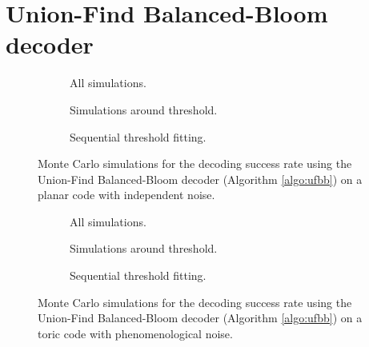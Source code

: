 \section{Union-Find Balanced-Bloom decoder}\label{ap:figufbb}


\begin{figure}[htbp]
  \centering
  \begin{subfigure}[b]{\textwidth}
    \begin{adjustbox}{Clip=0 1em 0 0}
    
    \end{adjustbox}
    \caption{All simulations.}
  \end{subfigure}
  \begin{subfigure}[b]{0.49\textwidth}
    \begin{adjustbox}{Clip=0 1em 0 0}
      
    \end{adjustbox}
    \caption{Simulations around threshold.}
  \end{subfigure}
  \begin{subfigure}[b]{0.49\textwidth}
    \begin{adjustbox}{Clip=0 1em 0 0}
      
    \end{adjustbox}
    \caption{Sequential threshold fitting.}
  \end{subfigure}
  \caption{Monte Carlo simulations for the decoding success rate using the Union-Find Balanced-Bloom decoder (Algorithm \ref{algo:ufbb}) on a planar code with independent noise.}
  \label{fig:thres_ufbb_planar_2d}
\end{figure}


\begin{figure}[htbp]
  \centering
  \begin{subfigure}[b]{\textwidth}
    \begin{adjustbox}{Clip=0 1em 0 0}
    
    \end{adjustbox}
    \caption{All simulations.}
  \end{subfigure}
  \begin{subfigure}[b]{0.49\textwidth}
    \begin{adjustbox}{Clip=0 1em 0 0}
      
    \end{adjustbox}
    \caption{Simulations around threshold.}
  \end{subfigure}
  \begin{subfigure}[b]{0.49\textwidth}
    \begin{adjustbox}{Clip=0 1em 0 0}
      
    \end{adjustbox}
    \caption{Sequential threshold fitting.}
  \end{subfigure}
  \caption{Monte Carlo simulations for the decoding success rate using the Union-Find Balanced-Bloom decoder (Algorithm \ref{algo:ufbb}) on a toric code with phenomenological noise.}
  \label{fig:thres_ufbb_toric_3d}
\end{figure}

